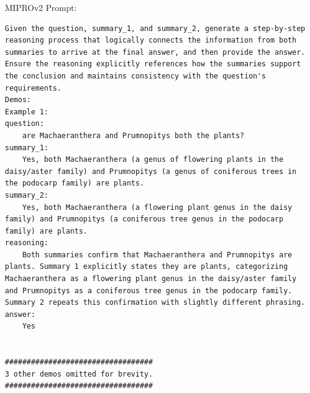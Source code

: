 \begin{instructbox}
MIPROv2 Prompt:
\begin{lstlisting}[breakindent=0pt, breaklines=true, breakatwhitespace=true, frame=single, backgroundcolor=\color{green!10}]
Given the question, summary_1, and summary_2, generate a step-by-step reasoning process that logically connects the information from both summaries to arrive at the final answer, and then provide the answer. Ensure the reasoning explicitly references how the summaries support the conclusion and maintains consistency with the question's requirements.
Demos:
Example 1:
question:
    are Machaeranthera and Prumnopitys both the plants?
summary_1:
    Yes, both Machaeranthera (a genus of flowering plants in the daisy/aster family) and Prumnopitys (a genus of coniferous trees in the podocarp family) are plants.
summary_2:
    Yes, both Machaeranthera (a flowering plant genus in the daisy family) and Prumnopitys (a coniferous tree genus in the podocarp family) are plants.
reasoning:
    Both summaries confirm that Machaeranthera and Prumnopitys are plants. Summary 1 explicitly states they are plants, categorizing Machaeranthera as a flowering plant genus in the daisy/aster family and Prumnopitys as a coniferous tree genus in the podocarp family. Summary 2 repeats this confirmation with slightly different phrasing.
answer:
    Yes


##################################
3 other demos omitted for brevity.
##################################

\end{lstlisting}


\end{instructbox}

